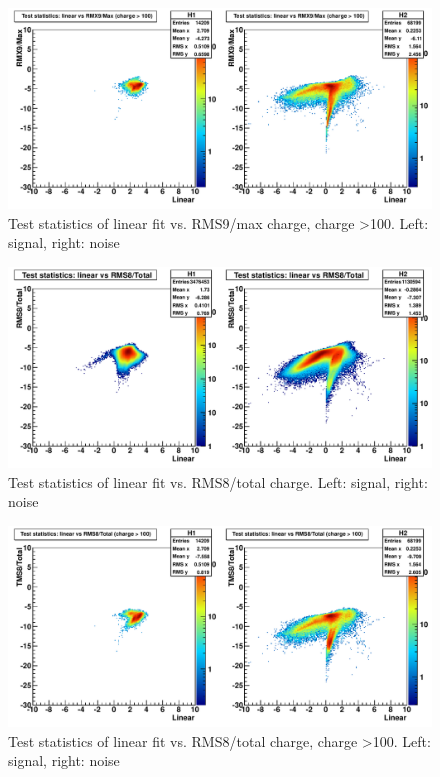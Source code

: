 \begin{figure}
\includegraphics[width=120mm]{DailyLog/6321/6321HTestStatisticsLinearVsRMS9OverMaxCharge100.pdf}
\caption{Test statistics of linear fit vs. RMS9/max charge, charge \textgreater 100.  Left: signal, right: noise}
\label{Figure_6321HTestStatisticsLinearVsRMS9OverMaxCharge100}
\end{figure}

\begin{figure}
\includegraphics[width=120mm]{DailyLog/6321/6321HTestStatisticsLinearVsRMS8OverTotalCharge.pdf}
\caption{Test statistics of linear fit vs. RMS8/total charge.  Left: signal, right: noise}
\label{Figure_6321HTestStatisticsLinearVsRMS8OverTotalCharge}
\end{figure}

\begin{figure}
\includegraphics[width=120mm]{DailyLog/6321/6321HTestStatisticsLinearVsRMS8OverTotalCharge100.pdf}
\caption{Test statistics of linear fit vs. RMS8/total charge, charge \textgreater 100.  Left: signal, right: noise}
\label{Figure_6321HTestStatisticsLinearVsRMS8OverTotalCharge100}
\end{figure}


